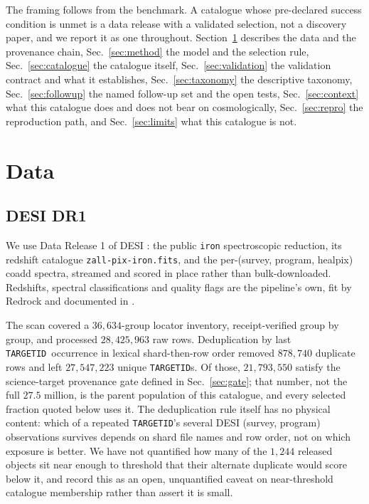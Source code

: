\documentclass[aps,prd,twocolumn,superscriptaddress,nofootinbib,longbibliography,floatfix]{revtex4-2}
\newcommand{\TARGETID}{\texttt{TARGETID}}
\begin{document}
The framing follows from the benchmark. A catalogue whose pre-declared
success condition is unmet is a data release with a validated selection, not
a discovery paper, and we report it as one throughout.
Section~\ref{sec:data} describes the data and the provenance chain,
Sec.~\ref{sec:method} the model and the selection rule,
Sec.~\ref{sec:catalogue} the catalogue itself,
Sec.~\ref{sec:validation} the validation contract and what it establishes,
Sec.~\ref{sec:taxonomy} the descriptive taxonomy, Sec.~\ref{sec:followup} the
named follow-up set and the open tests, Sec.~\ref{sec:context} what this
catalogue does and does not bear on cosmologically,
Sec.~\ref{sec:repro} the reproduction path, and Sec.~\ref{sec:limits} what
this catalogue is not.

\section{Data}
\label{sec:data}

\subsection{DESI DR1}
We use Data Release 1 of DESI \cite{DESIDR1,DESIInstrument}: the public
\texttt{iron} spectroscopic reduction, its redshift catalogue
\texttt{zall-pix-iron.fits}, and the per-(survey, program, healpix) coadd
spectra, streamed and scored in place rather than bulk-downloaded. Redshifts,
spectral classifications and quality flags are the pipeline's own, fit by
Redrock \cite{Redrock} and documented in \cite{DESIPipeline,DESIBitmasks}.

The scan covered a $36{,}634$-group locator inventory, receipt-verified group
by group, and processed
$28{,}425{,}963$ raw rows.
Deduplication by last \TARGETID\ occurrence in lexical shard-then-row order
removed $878{,}740$ duplicate rows and left $27{,}547{,}223$ unique
\TARGETID s.
Of those, $21{,}793{,}550$ satisfy the science-target provenance gate defined
in Sec.~\ref{sec:gate};
that number, not the full $27.5$ million, is the parent population of this
catalogue, and every selected fraction quoted below uses it. The
deduplication rule itself has no physical content: which of a repeated
\TARGETID's several DESI (survey, program) observations survives depends on
shard file names and row order, not on which exposure is better. We have not
quantified how many of the $1{,}244$ released objects sit near enough to
threshold that their alternate duplicate would score below it, and record
this as an open, unquantified caveat on near-threshold catalogue membership
rather than assert it is small.
\end{document}
